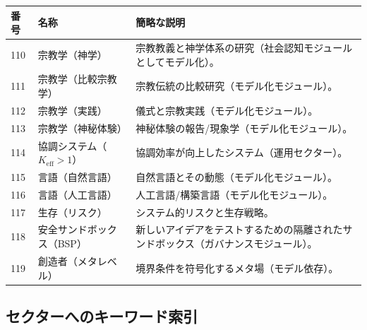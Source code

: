 \documentclass[13pt,a4paper]{ltjsarticle}
\newcommand{\Keff}{K_{\mathrm{eff}}}
\begin{document}
	\begin{longtable}{|p{0.9cm}|p{6.0cm}|p{8.6cm}|}
		\hline
		\textbf{番号} & \textbf{名称} & \textbf{簡略な説明} \\
		\hline
		\endhead
		110 & 宗教学（神学） & 宗教教義と神学体系の研究（社会認知モジュールとしてモデル化）。 \\
		\hline
		111 & 宗教学（比較宗教学） & 宗教伝統の比較研究（モデル化モジュール）。 \\
		\hline
		112 & 宗教学（実践） & 儀式と宗教実践（モデル化モジュール）。 \\
		\hline
		113 & 宗教学（神秘体験） & 神秘体験の報告/現象学（モデル化モジュール）。 \\
		\hline
		114 & 協調システム（$\Keff>1$） & 協調効率が向上したシステム（運用セクター）。 \\
		\hline
		115 & 言語（自然言語） & 自然言語とその動態（モデル化モジュール）。 \\
		\hline
		116 & 言語（人工言語） & 人工言語/構築言語（モデル化モジュール）。 \\
		\hline
		117 & 生存（リスク） & システム的リスクと生存戦略。 \\
		\hline
		118 & 安全サンドボックス（BSP） & 新しいアイデアをテストするための隔離されたサンドボックス（ガバナンスモジュール）。 \\
		\hline
		119 & 創造者（メタレベル） & 境界条件を符号化するメタ場（モデル依存）。 \\
		\hline
	\end{longtable}
	
	\subsection*{セクターへのキーワード索引}
	
\end{document}
